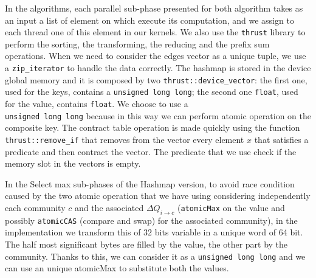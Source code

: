 In the algorithms, each parallel sub-phase presented for both algorithm takes as an input a list of element on which execute its computation, and we assign to each thread one of this element in our kernels. We also use the \verb|thrust| library to perform the sorting, the transforming, the reducing and the prefix sum operations. When we need to consider the edges vector as a unique tuple, we use a \verb|zip_iterator| to handle the data correctly.
The hashmap is stored in the device global memory and it is composed by two \verb|thrust::device_vector|: the first one, used for the keys, contains a \verb|unsigned long long|; the second one \verb|float|, used for the value, contains \verb|float|. We choose to use a \\\verb|unsigned long long| because in this way we can perform atomic operation on the composite key. The contract table operation is made quickly using the function \verb|thrust::remove_if| that removes from the vector every element $x$ that satisfies a predicate and then contract the vector. The predicate that we use check if the memory slot in the vectors is empty. 


In the Select max sub-phases of the Hashmap version, to avoid race condition caused by the two atomic operation that we have using considering independently each community $c$ and the associated $\Delta Q_{i\rightarrow c}$ (\verb|atomicMax| on the value and possibly \verb|atomicCAS| (compare and swap) for the associated community), in the implementation we transform this of 32 bits variable in a unique word of 64 bit. The half most significant bytes are filled by the value, the other part by the community. Thanks to this, we can consider it as a \verb|unsigned long long| and we can use an unique atomicMax to substitute both the values. 
